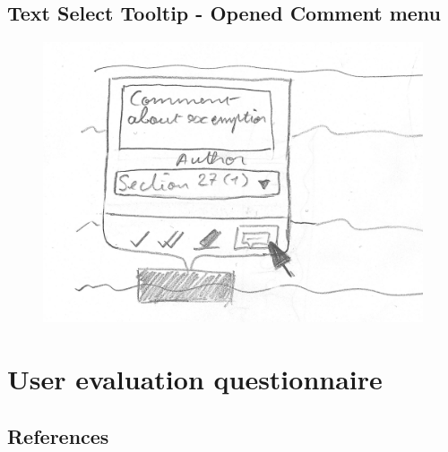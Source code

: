 \documentclass{l4proj}
\begin{document}
\begin{appendices}
    \section{Text Select Tooltip - Opened Comment menu}
    \begin{figure}[H]
        \centering
        \includegraphics[width=\linewidth]{images/wireframes/tooltip_comment.jpg}
    \end{figure}
    \chapter{User evaluation questionnaire}
    \label{appendix:questionnaire}
    
\end{appendices}


\newpage


\section*{References}

\printbibliography[heading=none]

\vspace*{\fill}
\doclicenseThis
\end{document}
